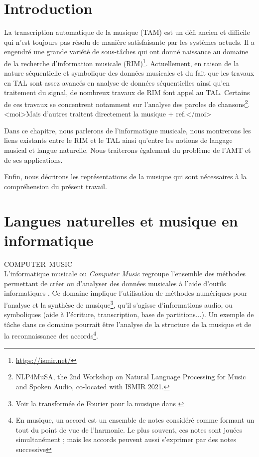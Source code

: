 \section*{Introduction}
La transcription automatique de la musique (TAM) est un défi ancien
\cite{first_one} et difficile qui n’est toujours pas résolu de manière
satisfaisante par les systèmes actuels. Il a engendré une
grande variété de sous-tâches qui ont donné naissance au domaine de la
recherche d’information musicale (RIM)\footnote{\url{https://ismir.net/}}.
Actuellement, en raison de la nature séquentielle et symbolique des données
musicales et du fait que les travaux en TAL sont assez avancés en analyse de
données séquentielles ainsi qu’en traitement du signal, de nombreux travaux de
RIM font appel au TAL. Certains de ces travaux se concentrent notamment sur
l’analyse des paroles de chansons\footnote{NLP4MuSA, the 2nd Workshop on
Natural Language Processing for Music and Spoken Audio, co-located with ISMIR
2021.}. <moi>Mais d’autres traitent directement la musique + ref.</moi>

Dans ce chapitre, nous parlerons de l’informatique musicale, nous montrerons
les liens existants entre le RIM et le TAL ainsi qu’entre les notions de
langage musical et langue naturelle. Nous traiterons également du problème de
l’AMT et de ses applications.

Enfin, nous décrirons les représentations de la musique qui sont nécessaires à
la compréhension du présent travail.
\section{Langues naturelles et musique en informatique}
COMPUTER MUSIC\\
L’informatique musicale ou \textit{Computer Music} regroupe l’ensemble des
méthodes permettant de créer ou d’analyser des données musicales à l’aide
d’outils informatiques \cite{book_muller}. Ce domaine implique l’utilisation de
méthodes numériques pour l’analyse et la synthèse de musique\footnote{Voir la
transformée de Fourier pour la musique dans \cite{fourier}}, qu’il s’agisse
d’informations audio, ou symboliques (aide à l’écriture, transcription, base de
partitions...). Un exemple de tâche dans ce domaine pourrait être l’analyse de
la structure de la musique et de la reconnaissance des accords\footnote{En
musique, un accord est un ensemble de notes considéré comme formant un tout du
point de vue de l’harmonie. Le plus souvent, ces notes sont jouées
simultanément ; mais les accords peuvent aussi s’exprimer par des notes
successive}.\\

